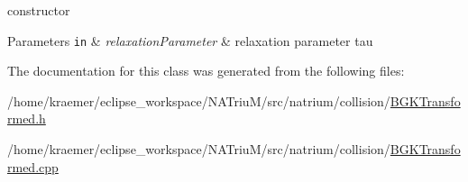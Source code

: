 constructor 


\begin{DoxyParams}[1]{Parameters}
\mbox{\tt in}  & {\em relaxation\-Parameter} & relaxation parameter tau \\
\hline
\end{DoxyParams}


The documentation for this class was generated from the following files\-:\begin{DoxyCompactItemize}
\item 
/home/kraemer/eclipse\-\_\-workspace/\-N\-A\-Triu\-M/src/natrium/collision/\hyperlink{BGKTransformed_8h}{B\-G\-K\-Transformed.\-h}\item 
/home/kraemer/eclipse\-\_\-workspace/\-N\-A\-Triu\-M/src/natrium/collision/\hyperlink{BGKTransformed_8cpp}{B\-G\-K\-Transformed.\-cpp}\end{DoxyCompactItemize}
